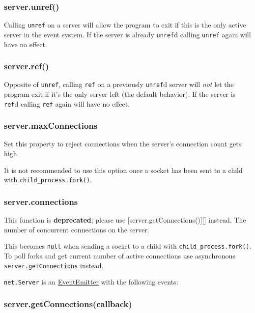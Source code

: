 \subsubsection{server.unref()}

Calling \texttt{unref} on a server will allow the program to exit if
this is the only active server in the event system. If the server is
already \texttt{unref}d calling \texttt{unref} again will have no
effect.

\subsubsection{server.ref()}

Opposite of \texttt{unref}, calling \texttt{ref} on a previously
\texttt{unref}d server will \emph{not} let the program exit if it's the
only server left (the default behavior). If the server is \texttt{ref}d
calling \texttt{ref} again will have no effect.

\subsubsection{server.maxConnections}

Set this property to reject connections when the server's connection
count gets high.

It is not recommended to use this option once a socket has been sent to
a child with \texttt{child\_process.fork()}.

\subsubsection{server.connections}

This function is \textbf{deprecated}; please use
{[}server.getConnections(){]}{[}{]} instead. The number of concurrent
connections on the server.

This becomes \texttt{null} when sending a socket to a child with
\texttt{child\_process.fork()}. To poll forks and get current number of
active connections use asynchronous \texttt{server.getConnections}
instead.

\texttt{net.Server} is an
\href{events.html\#events\_class\_events\_eventemitter}{EventEmitter}
with the following events:

\subsubsection{server.getConnections(callback)}


